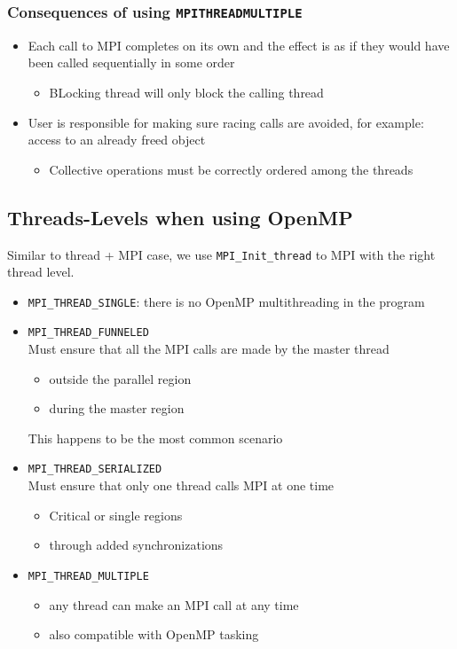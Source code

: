 \documentclass[12pt, a4paper]{report}
\begin{document}
\subsubsection{Consequences of using \texttt{MPI\textunderscore THREAD\textunderscore MULTIPLE}}
\begin{itemize}
    \item Each call to MPI completes on its own and the effect is as if they would have been called sequentially in some order
    \begin{itemize}
        \item BLocking thread will only block the calling thread
    \end{itemize}

    \item User is responsible for making sure racing calls are avoided, for example: access to an already freed object
    \begin{itemize}
        \item Collective operations must be correctly ordered among the threads
    \end{itemize} 
\end{itemize}

\subsection{Threads-Levels when using OpenMP}
Similar to thread + MPI case, we use \verb$MPI_Init_thread$ to MPI with the right thread level.
\begin{itemize}
    \item \verb$MPI_THREAD_SINGLE$: there is no OpenMP multithreading in the program
    \item \verb$MPI_THREAD_FUNNELED$\\
          Must ensure that all the MPI calls are made by the master thread
          \begin{itemize}
              \item outside the parallel region
              \item during the master region
          \end{itemize}
          This happens to be the most common scenario
    \item \verb$MPI_THREAD_SERIALIZED$\\
          Must ensure that only one thread calls MPI at one time
          \begin{itemize}
              \item Critical or single regions
              \item through added synchronizations
          \end{itemize}
    \item \verb$MPI_THREAD_MULTIPLE$
    \begin{itemize}
        \item any thread can make an MPI call at any time
        \item also compatible with OpenMP tasking
    \end{itemize}
\end{itemize}
\end{document}
